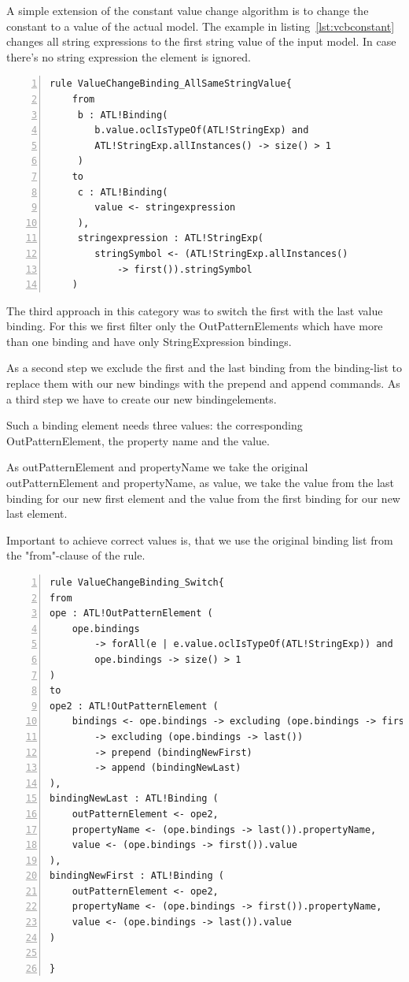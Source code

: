 \documentclass{llncs}
\begin{document}
A simple extension of the constant value change algorithm is to change the constant to a value of the actual model. The example in listing~\ref{lst:vcbconstant} changes all string expressions to the first string value of the input model. In case there's no string expression the element is ignored.

\begin{lstlisting}[language=ATL, numbers=left,xleftmargin=5.0ex, caption=ValueChangeBinding-Definition using same constant string value., label=lst:vcbconstant]
rule ValueChangeBinding_AllSameStringValue{
	from
	 b : ATL!Binding(
	 	b.value.oclIsTypeOf(ATL!StringExp) and 
		ATL!StringExp.allInstances() -> size() > 1
	 )
	to
	 c : ATL!Binding(
	 	value <- stringexpression
	 ), 
	 stringexpression : ATL!StringExp(
	 	stringSymbol <- (ATL!StringExp.allInstances() 
			-> first()).stringSymbol
	)
\end{lstlisting}

The third approach in this category was to switch the first with the last value binding. For this we first filter only the OutPatternElements which have more than one binding and have only StringExpression bindings.

As a second step we exclude the first and the last binding from the binding-list to replace them with our new bindings with the prepend and append commands. As a third step we have to create our new bindingelements.

Such a binding element needs three values: the corresponding OutPatternElement, the property name and the value.

As outPatternElement and propertyName we take the original outPatternElement and propertyName, as value, we take the value from the last binding for our new first element and the value from the first binding for our new last element.

Important to achieve correct values is, that we use the original binding list from the "from"-clause of the rule.

\begin{lstlisting}[language=ATL, numbers=left,xleftmargin=5.0ex, caption=ValueChangeBinding-Definition using values from input models., label=lst:2ndOrderHOT]
rule ValueChangeBinding_Switch{
from
ope : ATL!OutPatternElement (
	ope.bindings 
		-> forAll(e | e.value.oclIsTypeOf(ATL!StringExp)) and
		ope.bindings -> size() > 1
)
to
ope2 : ATL!OutPatternElement (
	bindings <- ope.bindings -> excluding (ope.bindings -> first()) 
		-> excluding (ope.bindings -> last())
		-> prepend (bindingNewFirst)
		-> append (bindingNewLast)
), 
bindingNewLast : ATL!Binding (
	outPatternElement <- ope2, 
	propertyName <- (ope.bindings -> last()).propertyName,
	value <- (ope.bindings -> first()).value
),
bindingNewFirst : ATL!Binding (
	outPatternElement <- ope2,
	propertyName <- (ope.bindings -> first()).propertyName,
	value <- (ope.bindings -> last()).value	
)
	
}
\end{lstlisting}
\end{document}
